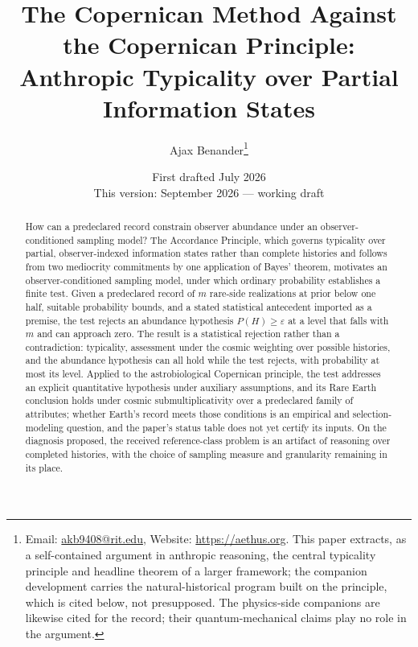 \newtheorem{theorem}{Theorem}
\newtheorem{principle}{Principle}
\newtheorem{corollary}{Corollary}
\newtheorem{lemma}{Lemma}
\theoremstyle{definition}
\newtheorem{definition}{Definition}

\title{The Copernican Method Against the Copernican Principle:\\ Anthropic Typicality over Partial Information States}
\author{Ajax Benander\thanks{Email: \href{mailto:akb9408@rit.edu}{akb9408@rit.edu}, Website: \url{https://aethus.org}. This paper extracts, as a self-contained argument in anthropic reasoning, the central typicality principle and headline theorem of a larger framework; the companion development \cite{Nexus} carries the natural-historical program built on the principle, which is cited below, not presupposed. The physics-side companions \cite{AethusBrief, Aethus} are likewise cited for the record; their quantum-mechanical claims play no role in the argument.}}
\date{First drafted July 2026\\ {\small This version: September 2026 --- working draft}}
\usepackage{booktabs}
\usepackage{enumitem}


\maketitle

\begin{abstract}
How can a predeclared record constrain observer abundance under an observer-conditioned sampling model? The Accordance Principle, which governs typicality over partial, observer-indexed information states rather than complete histories and follows from two mediocrity commitments by one application of Bayes' theorem, motivates an observer-conditioned sampling model, under which ordinary probability establishes a finite test. Given a predeclared record of $m$ rare-side realizations at prior below one half, suitable probability bounds, and a stated statistical antecedent imported as a premise, the test rejects an abundance hypothesis $P(H) \ge \varepsilon$ at a level that falls with $m$ and can approach zero. The result is a statistical rejection rather than a contradiction: typicality, assessment under the cosmic weighting over possible histories, and the abundance hypothesis can all hold while the test rejects, with probability at most its level. Applied to the astrobiological Copernican principle, the test addresses an explicit quantitative hypothesis under auxiliary assumptions, and its Rare Earth conclusion holds under cosmic submultiplicativity over a predeclared family of attributes; whether Earth's record meets those conditions is an empirical and selection-modeling question, and the paper's status table does not yet certify its inputs. On the diagnosis proposed, the received reference-class problem is an artifact of reasoning over completed histories, with the choice of sampling measure and granularity remaining in its place.
\end{abstract}

